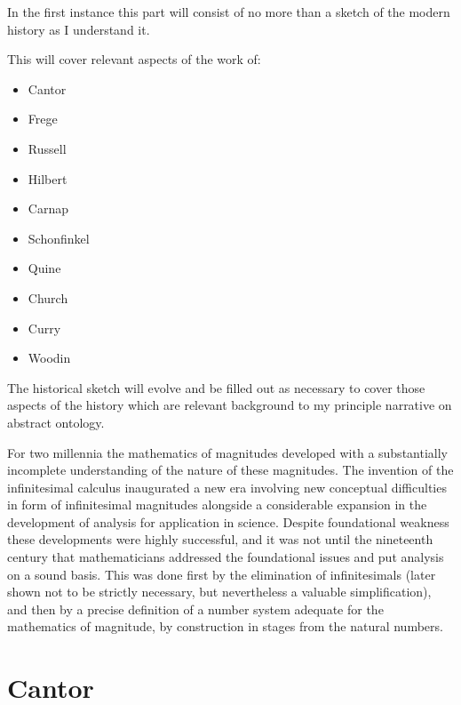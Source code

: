 
In the first instance this part will consist of no more than a sketch of the modern history as I understand it.

This will cover relevant aspects of the work of:

\begin{itemize}
\item Cantor
\item Frege
\item Russell
\item Hilbert
\item Carnap
\item Schonfinkel
\item Quine
\item Church
\item Curry
\item Woodin
\end{itemize}

The historical sketch will evolve and be filled out as necessary to cover those aspects of the history which are relevant background to my principle narrative on abstract ontology.

For two millennia the mathematics of magnitudes developed with a substantially incomplete understanding of the nature of these magnitudes.
The invention of the infinitesimal calculus inaugurated a new era involving new conceptual difficulties in form of infinitesimal magnitudes alongside a considerable expansion in the development of analysis for application in science.
Despite foundational weakness these developments were highly successful, and it was not until the nineteenth century that mathematicians addressed the foundational issues and put analysis on a sound basis.
This was done first by the elimination of infinitesimals (later shown not to be strictly necessary, but nevertheless a valuable simplification), and then by a precise definition of a number system adequate for the mathematics of magnitude, by construction in stages from the natural numbers.

\section{Cantor}


